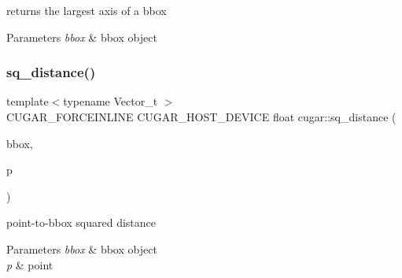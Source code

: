 returns the largest axis of a bbox


\begin{DoxyParams}{Parameters}
{\em bbox} & bbox object \\
\hline
\end{DoxyParams}
\mbox{\label{group___bbox_module_ga771255b0f67e5f421e1cbb5b2fa367e0}} 
\subsubsection{\texorpdfstring{sq\+\_\+distance()}{sq\_distance()}}
{\footnotesize\ttfamily template$<$typename Vector\+\_\+t $>$ \\
C\+U\+G\+A\+R\+\_\+\+F\+O\+R\+C\+E\+I\+N\+L\+I\+NE C\+U\+G\+A\+R\+\_\+\+H\+O\+S\+T\+\_\+\+D\+E\+V\+I\+CE float cugar\+::sq\+\_\+distance (\begin{DoxyParamCaption}\item[{const \hyperlink{structcugar_1_1_bbox}{Bbox}$<$ Vector\+\_\+t $>$ \&}]{bbox,  }\item[{const Vector\+\_\+t \&}]{p }\end{DoxyParamCaption})}

point-\/to-\/bbox squared distance


\begin{DoxyParams}{Parameters}
{\em bbox} & bbox object \\
\hline
{\em p} & point \\
\hline
\end{DoxyParams}
